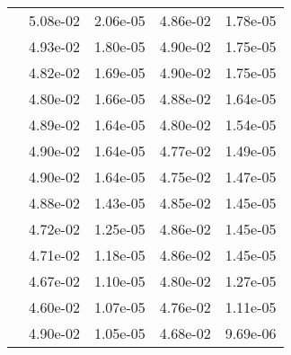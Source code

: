 \begin{table}
\begin{tabular}{c|cc|cc|}
\multicolumn{1}{|c|}{} & \multicolumn{1}{|c|}{  5.08e-02} & \multicolumn{1}{|c|}{  2.06e-05} & \multicolumn{1}{|c|}{  4.86e-02} & \multicolumn{1}{|c|}{  1.78e-05} \\ 
\multicolumn{1}{|c|}{} & \multicolumn{1}{|c|}{  4.93e-02} & \multicolumn{1}{|c|}{  1.80e-05} & \multicolumn{1}{|c|}{  4.90e-02} & \multicolumn{1}{|c|}{  1.75e-05} \\ 
\multicolumn{1}{|c|}{} & \multicolumn{1}{|c|}{  4.82e-02} & \multicolumn{1}{|c|}{  1.69e-05} & \multicolumn{1}{|c|}{  4.90e-02} & \multicolumn{1}{|c|}{  1.75e-05} \\ 
\multicolumn{1}{|c|}{} & \multicolumn{1}{|c|}{  4.80e-02} & \multicolumn{1}{|c|}{  1.66e-05} & \multicolumn{1}{|c|}{  4.88e-02} & \multicolumn{1}{|c|}{  1.64e-05} \\ 
\multicolumn{1}{|c|}{} & \multicolumn{1}{|c|}{  4.89e-02} & \multicolumn{1}{|c|}{  1.64e-05} & \multicolumn{1}{|c|}{  4.80e-02} & \multicolumn{1}{|c|}{  1.54e-05} \\ 
\multicolumn{1}{|c|}{} & \multicolumn{1}{|c|}{  4.90e-02} & \multicolumn{1}{|c|}{  1.64e-05} & \multicolumn{1}{|c|}{  4.77e-02} & \multicolumn{1}{|c|}{  1.49e-05} \\ 
\multicolumn{1}{|c|}{} & \multicolumn{1}{|c|}{  4.90e-02} & \multicolumn{1}{|c|}{  1.64e-05} & \multicolumn{1}{|c|}{  4.75e-02} & \multicolumn{1}{|c|}{  1.47e-05} \\ 
\multicolumn{1}{|c|}{} & \multicolumn{1}{|c|}{  4.88e-02} & \multicolumn{1}{|c|}{  1.43e-05} & \multicolumn{1}{|c|}{  4.85e-02} & \multicolumn{1}{|c|}{  1.45e-05} \\ 
\multicolumn{1}{|c|}{} & \multicolumn{1}{|c|}{  4.72e-02} & \multicolumn{1}{|c|}{  1.25e-05} & \multicolumn{1}{|c|}{  4.86e-02} & \multicolumn{1}{|c|}{  1.45e-05} \\ 
\multicolumn{1}{|c|}{} & \multicolumn{1}{|c|}{  4.71e-02} & \multicolumn{1}{|c|}{  1.18e-05} & \multicolumn{1}{|c|}{  4.86e-02} & \multicolumn{1}{|c|}{  1.45e-05} \\ 
\multicolumn{1}{|c|}{} & \multicolumn{1}{|c|}{  4.67e-02} & \multicolumn{1}{|c|}{  1.10e-05} & \multicolumn{1}{|c|}{  4.80e-02} & \multicolumn{1}{|c|}{  1.27e-05} \\ 
\multicolumn{1}{|c|}{} & \multicolumn{1}{|c|}{  4.60e-02} & \multicolumn{1}{|c|}{  1.07e-05} & \multicolumn{1}{|c|}{  4.76e-02} & \multicolumn{1}{|c|}{  1.11e-05} \\ 
\multicolumn{1}{|c|}{} & \multicolumn{1}{|c|}{  4.90e-02} & \multicolumn{1}{|c|}{  1.05e-05} & \multicolumn{1}{|c|}{  4.68e-02} & \multicolumn{1}{|c|}{  9.69e-06} \\ 

\end{tabular}
\end{table}

